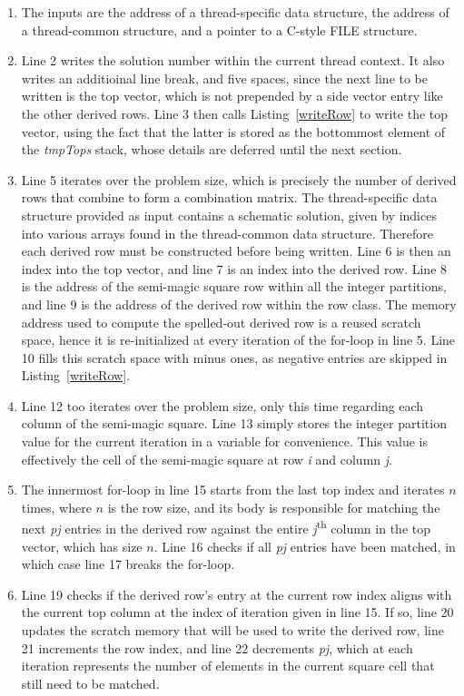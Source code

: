 \begin{enumerate}
\item The inputs are the address of a thread-specific data structure, the address of a thread-common structure, and a pointer to a C-style FILE structure.
\item Line 2 writes the solution number within the current thread context. It also writes an additioinal line break, and five spaces, since the next line to be written is the top vector, which is not prepended by a side vector entry like the other derived rows. Line 3 then calls Listing~\ref{writeRow} to write the top vector, using the fact that the latter is stored as the bottommost element of the \emph{tmpTops} stack, whose details are deferred until the next section. 
\addtocounter{enumi}{2}
\item Line 5 iterates over the problem size, which is precisely the number of derived rows that combine to form a combination matrix. The thread-specific data structure provided as input contains a schematic solution, given by indices into various arrays found in the thread-common data structure. Therefore each derived row must be constructed before being written. Line 6 is then an index into the top vector, and line 7 is an index into the derived row. Line 8 is the address of the semi-magic square row within all the integer partitions, and line 9 is the address of the derived row within the row class. The memory address used to compute the spelled-out derived row is a reused scratch space, hence it is re-initialized at every iteration of the for-loop in line 5. Line 10 fills this scratch space with minus ones, as negative entries are skipped in Listing~\ref{writeRow}.
\addtocounter{enumi}{6}
\item Line 12 too iterates over the problem size, only this time regarding each column of the semi-magic square. Line 13 simply stores the integer partition value for the current iteration in a variable for convenience. This value is effectively the cell of the semi-magic square at row \emph{i} and column \emph{j}.
\addtocounter{enumi}{2}
\item The innermost for-loop in line 15 starts from the last top index and iterates $n$ times, where $n$ is the row size, and its body is responsible for matching the next \emph{pj} entries in the derived row against the entire \emph{j}\textsuperscript{th} column in the top vector, which has size $n$. Line 16 checks if all \emph{pj} entries have been matched, in which case line 17 breaks the for-loop.
\addtocounter{enumi}{2}
\item Line 19 checks if the derived row's entry at the current row index aligns with the current top column at the index of iteration given in line 15. If so, line 20 updates the scratch memory that will be used to write the derived row, line 21 increments the row index, and line 22 decrements \emph{pj}, which at each iteration represents the number of elements in the current square cell that still need to be matched.

\end{enumerate}
